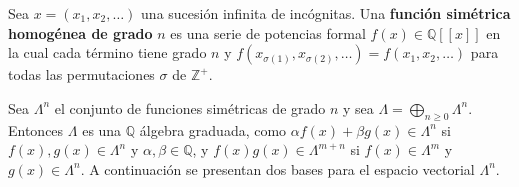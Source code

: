 \documentclass[12pt]{book}
\theoremstyle{definition}
\newcounter{in}
\newcounter{ini}
\begin{document}
Sea $x = (x_1, x_2, \ldots)$ una sucesión infinita de incógnitas. Una
\textbf{función simétrica homogénea de grado} $n$ es una serie de
potencias formal
$f(x) \in \mathbb{Q}\left [ \left [ x \right ] \right ]$ en la cual
cada término tiene grado $n$ y
$f(x_{\sigma(1)},x_{\sigma(2)}, \ldots) = f(x_1, x_2, \ldots)$ para
todas las permutaciones $\sigma$ de $\mathbb{Z}^{+}$.

Sea $\Lambda^{n}$ el conjunto de funciones simétricas de grado $n$ y
sea $\Lambda = \bigoplus_{n \geq 0} \Lambda^{n}$. Entonces $\Lambda$
es una $\mathbb{Q}$ álgebra graduada, como
$\alpha f(x) + \beta g(x) \in \Lambda^{n}$ si
$f(x), g(x) \in \Lambda^{n}$ y $\alpha, \beta \in \mathbb{Q}$, y
$f(x)g(x) \in \Lambda^{m+n}$ si $f(x) \in \Lambda^{m}$ y
$g(x) \in \Lambda^{n}$.
A continuación se presentan dos bases para el espacio vectorial
$\Lambda^{n}$.  
\end{document}

